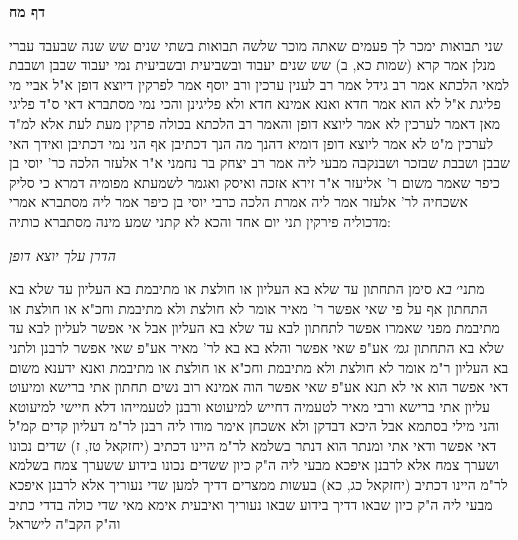 \documentclass[12pt, openany]{book}
\newcommand{\sethebfont}{
\fontsize{10.5pt}{21.0pt} \selectfont
}
\newcommand{\twocol}[1]{
	{\sethebfont \begin{multicols}{2}
			#1
	\end{multicols}}	
}
\newcommand{\sectname}{}
\newcommand{\newsection}[1]{
	\addcontentsline{toc}{section}{#1}
	\renewcommand{\sectname}{#1}	
	\vspace{-\baselineskip}
	\begin{center}
		\textbf{%
\fontsize{16pt}{16pt}\selectfont
			#1}
	\end{center}
	\vspace{-\baselineskip}
	\nopagebreak
}
\begin{document}
\newsection{דף מח}
\twocol{שני תבואות ימכר לך פעמים שאתה מוכר שלשה תבואות בשתי שנים 
שש שנה שבעבד עברי מנלן  אמר קרא  (שמות כא, ב) שש שנים יעבוד ובשביעית ובשביעית נמי יעבוד 
שבבן ושבבת למאי הלכתא  אמר רב גידל אמר רב  לענין ערכין  ורב יוסף אמר  לפרקין דיוצא דופן 
א"ל אביי  מי פליגת  א"ל  לא הוא אמר חדא ואנא אמינא חדא ולא פליגינן 
והכי נמי מסתברא דאי ס"ד פליגי מאן דאמר לערכין לא אמר ליוצא דופן  והאמר רב  הלכתא בכולה פרקין מעת לעת 
אלא למ"ד לערכין מ"ט לא אמר ליוצא דופן  דומיא דהנך מה הנך דכתיבן אף הני נמי דכתיבן 
ואידך האי שבבן ושבבת שבזכר ושבנקבה מבעי ליה 
אמר רב יצחק בר נחמני א"ר אלעזר  הלכה כר' יוסי בן כיפר שאמר משום ר' אליעזר  א"ר זירא  אזכה ואיסק ואגמר לשמעתא מפומיה דמרא 
כי סליק אשכחיה לר' אלעזר אמר ליה  אמרת הלכה כרבי יוסי בן כיפר  אמר ליה  מסתברא אמרי מדכוליה פירקין תני יום אחד והכא לא קתני שמע מינה מסתברא כותיה:
\par \par {\large\emph{הדרן עלך יוצא דופן}}\par \par 
מתני׳ {\large\emph{בא}} סימן התחתון עד שלא בא העליון או חולצת או מתיבמת
בא העליון עד שלא בא התחתון אף על פי שאי אפשר ר' מאיר אומר  לא חולצת ולא מתיבמת
וחכ"א  או חולצת או מתיבמת  מפני שאמרו אפשר לתחתון לבא עד שלא בא העליון  אבל אי אפשר לעליון לבא עד שלא בא התחתון
{\large\emph{גמ׳}} אע"פ שאי אפשר והלא בא בא לר' מאיר אע"פ שאי אפשר לרבנן 
ולתני בא העליון ר"מ אומר  לא חולצת ולא מתיבמת  וחכ"א  או חולצת או מתיבמת ואנא ידענא משום דאי אפשר הוא 
אי לא תנא אע"פ שאי אפשר הוה אמינא  רוב נשים תחתון אתי ברישא ומיעוט עליון אתי ברישא  ורבי מאיר לטעמיה דחייש למיעוטא ורבנן לטעמייהו דלא חיישי למיעוטא 
והני מילי בסתמא אבל היכא דבדקן ולא אשכחן אימר מודו ליה רבנן לר"מ דעליון קדים
קמ"ל דאי אפשר  ודאי אתי ומנתר הוא דנתר 
בשלמא לר"מ היינו דכתיב (יחזקאל טז, ז) שדים נכונו ושערך צמח אלא לרבנן איפכא מבעי ליה  ה"ק  כיון ששדים נכונו בידוע ששערך צמח 
בשלמא לר"מ היינו דכתיב (יחזקאל כג, כא) בעשות ממצרים דדיך למען שדי נעוריך אלא לרבנן איפכא מבעי ליה 
ה"ק  כיון שבאו דדיך בידוע שבאו נעוריך  ואיבעית אימא  מאי שדי כולה בדדי כתיב וה"ק הקב"ה לישראל}
\end{document}
